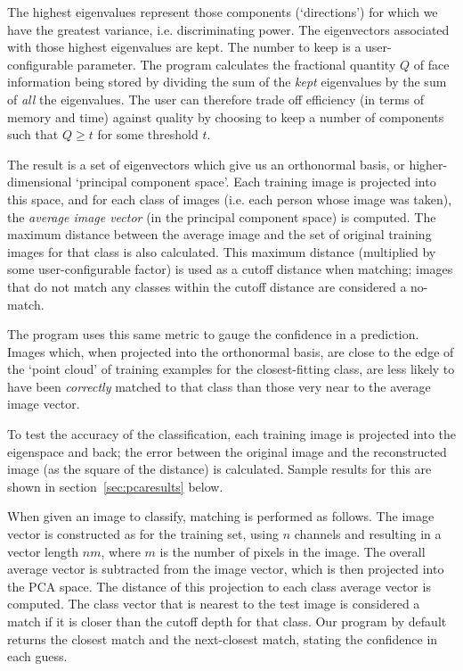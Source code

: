 The highest eigenvalues represent those components (`directions') for which we have the greatest variance, i.e. discriminating power. The eigenvectors associated with those highest eigenvalues are kept. The number to keep is a user-configurable parameter. The program calculates the fractional quantity $Q$ of face information being stored by dividing the sum of the \emph{kept} eigenvalues by the sum of \emph{all} the eigenvalues. The user can therefore trade off efficiency (in terms of memory and time) against quality by choosing to keep a number of components such that $Q \geq t$ for some threshold $t$.

The result is a set of eigenvectors which give us an orthonormal basis, or higher-dimensional `principal component space'. Each training image is projected into this space, and for each class of images (i.e. each person whose image was taken), the \emph{average image vector} (in the principal component space) is computed. The maximum distance between
the average image and the set of original training images for that class is also calculated. This maximum distance
(multiplied by some user-configurable factor) is used as a cutoff distance when
matching; images that do not match any classes within the cutoff distance are
considered a no-match.

The program uses this same metric to gauge the confidence in a prediction. Images which, when projected into the orthonormal basis, are close to the edge of the `point cloud' of training examples for the closest-fitting class, are less likely to have been \emph{correctly} matched to that class than those very near to the average image vector.

To test the accuracy of the classification, each training image is projected
into the eigenspace and back; the error between the original image and the
reconstructed image (as the square of the distance) is calculated. Sample results for
this are shown in section~\ref{sec:pcaresults} below.

When given an image to classify, matching is performed as follows. The image
vector is constructed as for the training set, using $n$ channels and resulting
in a vector length $nm$, where $m$ is the number of pixels in the image. The
overall average vector is subtracted from the image vector, which is then
projected into the PCA space. The distance of this projection to each class
average vector is computed. The class vector that is nearest to the test image
is considered a match if it is closer than the cutoff depth for that class. Our
program by default returns the closest match and the next-closest match, stating
the confidence in each guess.

